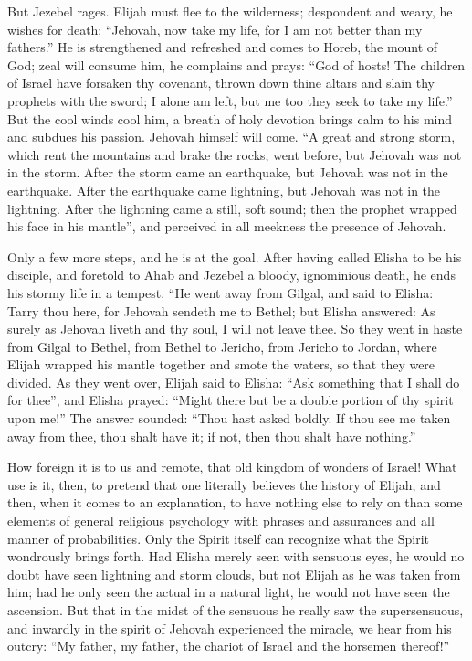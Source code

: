\documentclass[12pt,a4paper,openany]{book}
\newcommand{\opage}[1]{\marginnote{\footnotesize\textit{[#1]}}}
\begin{document}
But Jezebel rages. Elijah must flee to the wilderness; despondent
and weary, he wishes for death; ``Jehovah, now take
\setcounter{footnote}{0}%
\opage{37}my life, for I am not better than my fathers.''
He is strengthened and refreshed and comes to Horeb,
the mount of God; zeal will consume him, he complains and
prays: ``God of hosts! The children of Israel have forsaken
thy covenant, thrown down thine altars and slain thy prophets
with the sword; I alone am left, but me too
they seek to take my life.'' But the cool
winds cool him, a breath of holy devotion brings
calm to his mind and subdues his passion. Jehovah
himself will come. ``A great and strong storm, which rent
the mountains and brake the rocks, went before, but Jehovah
was not in the storm. After the storm came an earthquake,
but Jehovah was not in the earthquake. After
the earthquake came lightning, but Jehovah was not in
the lightning. After the lightning came a still, soft sound;
then the prophet wrapped his face in his mantle'', and perceived
in all meekness the presence of Jehovah.

Only a few more steps, and he is at the goal.
After having called Elisha to be his disciple, and foretold
to Ahab and Jezebel a bloody, ignominious death, he ends
his stormy life in a tempest. ``He went away
from Gilgal, and said to Elisha: Tarry thou here, for Jehovah
sendeth me to Bethel; but Elisha answered: As surely
as Jehovah liveth and thy soul, I will not leave thee.
So they went in haste from Gilgal to Bethel, from Bethel to
Jericho, from Jericho to Jordan, where Elijah wrapped his
mantle together and smote the waters, so that they were divided.
As they went over, Elijah said to Elisha: ``Ask something
that I shall do for thee'', and Elisha prayed: ``Might
there but be a double portion of thy spirit upon me!'' The answer
sounded: ``Thou hast asked boldly. If thou see me taken
\setcounter{footnote}{0}%
\opage{38}away from thee, thou shalt have it; if not, then thou shalt have
nothing.''

How foreign it is to us and remote, that old
kingdom of wonders of Israel! What use is it, then, to pretend
that one literally believes the history of Elijah, and then,
when it comes to an explanation, to have nothing else
to rely on than some elements of general religious
psychology with phrases and assurances and all manner of
probabilities. Only the Spirit itself can recognize what
the Spirit wondrously brings forth. Had Elisha merely seen
with sensuous eyes, he would no doubt have seen lightning and
storm clouds, but not Elijah as he was taken
from him; had he only seen the actual in a natural
light, he would not have seen the ascension. But
that in the midst of the sensuous he really saw the supersensuous,
and inwardly in the spirit of Jehovah experienced the miracle,
we hear from his outcry: ``My father, my father, the chariot of Israel
and the horsemen thereof!''
\end{document}
